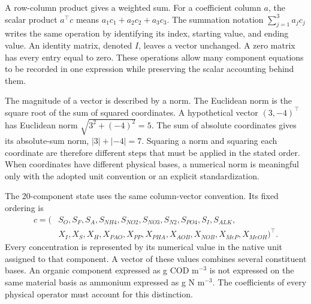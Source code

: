 A row-column product gives a weighted sum. For a coefficient column $a$, the scalar product $a^\top c$ means $a_1c_1+a_2c_2+a_3c_3$. The summation notation $\sum_{j=1}^3a_jc_j$ writes the same operation by identifying its index, starting value, and ending value. An identity matrix, denoted $I$, leaves a vector unchanged. A zero matrix has every entry equal to zero. These operations allow many component equations to be recorded in one expression while preserving the scalar accounting behind them.

The magnitude of a vector is described by a norm. The Euclidean norm is the square root of the sum of squared coordinates. A hypothetical vector $(3,-4)^\top$ has Euclidean norm $\sqrt{3^2+(-4)^2}=5$. The sum of absolute coordinates gives its absolute-sum norm, $|3|+|-4|=7$. Squaring a norm and squaring each coordinate are therefore different steps that must be applied in the stated order. When coordinates have different physical bases, a numerical norm is meaningful only with the adopted unit convention or an explicit standardization.

The 20-component state uses the same column-vector convention. Its fixed ordering is
\begin{equation}
\begin{split}
c=(&S_O,S_F,S_A,S_{NH4},S_{NO2},S_{NO3},S_{N2},S_{PO4},S_I,S_{ALK},\\
&X_I,X_S,X_H,X_{PAO},X_{PP},X_{PHA},X_{AOB},X_{NOB},X_{MeP},X_{MeOH})^\top.
\end{split}
\label{eq:component_order}
\end{equation}
Every concentration is represented by its numerical value in the native unit assigned to that component. A vector of these values combines several constituent bases. An organic component expressed as g COD m$^{-3}$ is not expressed on the same material basis as ammonium expressed as g N m$^{-3}$. The coefficients of every physical operator must account for this distinction.

